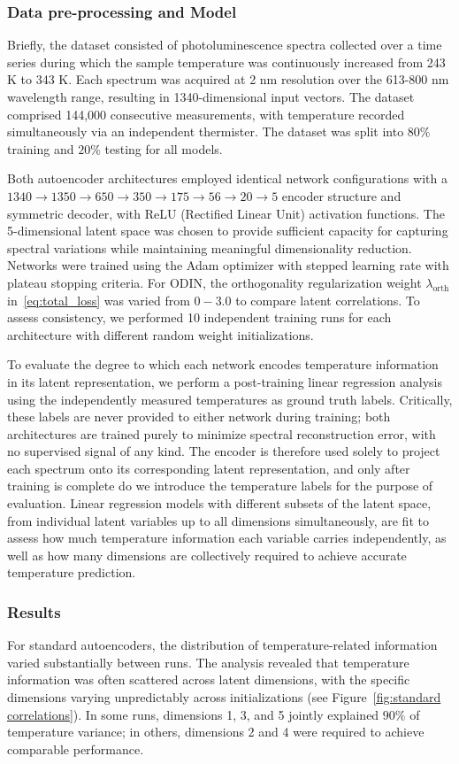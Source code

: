\documentclass[twoside,11pt]{article}
\begin{document}
\subsubsection*{Data pre-processing and  Model}
Briefly, the dataset consisted of photoluminescence spectra collected over a time series during which the sample temperature was continuously increased from 243 K to 343 K. Each spectrum was acquired at 2 nm resolution over the 613-800 nm wavelength range, resulting in 1340-dimensional input vectors. The dataset comprised 144,000 consecutive measurements, with temperature recorded simultaneously via an independent thermister. The dataset was split into $80\%$ training and $20\%$ testing for all models.

Both autoencoder architectures employed identical network configurations with a $1340\to1350\to650\to350\to175\to56\to20\to5$ encoder structure and symmetric decoder, with ReLU (Rectified Linear Unit) activation functions. The 5-dimensional latent space was chosen to provide sufficient capacity for capturing spectral variations while maintaining meaningful dimensionality reduction. Networks were trained using the Adam optimizer with stepped learning rate with plateau stopping criteria. For ODIN, the orthogonality regularization weight $\lambda_{\text{orth}}$ in~\ref{eq:total_loss} was varied from $0-3.0$ to compare latent correlations. To assess consistency, we performed 10 independent training runs for each architecture with different random weight initializations.

To evaluate the degree to which each network encodes temperature information in its latent representation, we perform a post-training linear regression analysis using the independently measured temperatures as ground truth labels. Critically, these labels are never provided to either network during training; both architectures are trained purely to minimize spectral reconstruction error, with no supervised signal of any kind. The encoder is therefore used solely to project each spectrum onto its corresponding latent representation, and only after training is complete do we introduce the temperature labels for the purpose of evaluation. Linear regression models with different subsets of the latent space, from individual latent variables up to all dimensions simultaneously, are fit to assess how much temperature information each variable carries independently, as well as how many dimensions are collectively required to achieve accurate temperature prediction.

\subsubsection*{Results}
For standard autoencoders, the distribution of temperature-related information varied substantially between runs. The analysis revealed that temperature information was often scattered across latent dimensions, with the specific dimensions varying unpredictably across initializations (see Figure~\ref{fig:standard correlations}). In some runs, dimensions 1, 3, and 5 jointly explained $90\%$ of temperature variance; in others, dimensions 2 and 4 were required to achieve comparable performance.
\end{document}
